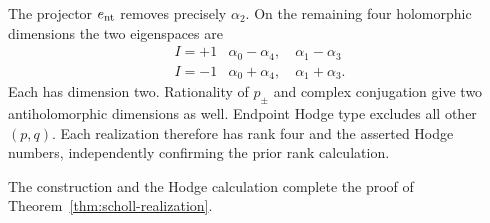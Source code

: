 The projector $e_{\mathrm{nt}}$ removes precisely $\alpha_2$. On the remaining four
holomorphic dimensions the two eigenspaces are
\[
\begin{array}{c|c}
I=+1&\alpha_0-\alpha_4,\quad\alpha_1-\alpha_3\\[2pt]
I=-1&\alpha_0+\alpha_4,\quad\alpha_1+\alpha_3.
\end{array}
\]
Each has dimension two. Rationality of $p_\pm$ and complex conjugation give
two antiholomorphic dimensions as well. Endpoint Hodge type excludes all
other $(p,q)$. Each realization therefore has rank four and the asserted
Hodge numbers, independently confirming the prior rank calculation.


The construction and the Hodge calculation complete the proof of
Theorem~\ref{thm:scholl-realization}.
